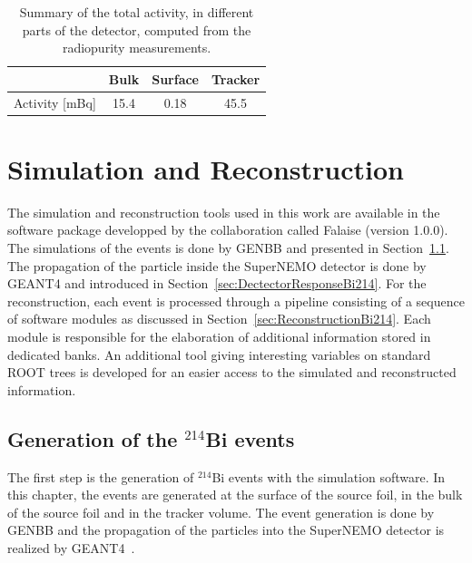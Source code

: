 \documentclass[main.tex]{subfiles}
\begin{document}
\begin{table}[h!]
\begin{center}
\begin{tabular}{c|c|c|c}
               & Bulk & Surface & Tracker \\[0.1cm]
\hline
Activity [mBq] & 15.4 & 0.18    & 45.5    \\[0.1cm]
\hline
\end{tabular}
\end{center}
\caption{Summary of the total activity, in different parts of the detector, computed from the radiopurity measurements.}
\label{activity_measurement_different_parts}
\end{table}



\section{Simulation and Reconstruction}\label{sec:SimuReco}


\noindent The simulation and reconstruction tools used in this work are available in the software package developped by the collaboration called Falaise (version 1.0.0). The simulations of the events is done by GENBB and presented in Section~\ref{sec:GenerationBi214}. The propagation of the particle inside the SuperNEMO detector is done by GEANT4 and introduced in Section~\ref{sec:DectectorResponseBi214}. For the reconstruction, each event is processed through a pipeline consisting of a sequence of software modules as discussed in Section~\ref{sec:ReconstructionBi214}. Each module is responsible for the elaboration of additional information stored in dedicated banks. An additional tool giving interesting variables on standard ROOT trees is developed for an easier access to the simulated and reconstructed information.


\subsection{Generation of the $^{\text{214}}$Bi events}\label{sec:GenerationBi214}


\noindent The first step is the generation of $^{\text{214}}$Bi events with the simulation software. In this chapter, the events are generated at the surface of the source foil, in the bulk of the source foil and in the tracker volume. The event generation is done by GENBB and the propagation of the particles into the SuperNEMO detector is realized by GEANT4~\cite{GEANT4}.
\end{document}
